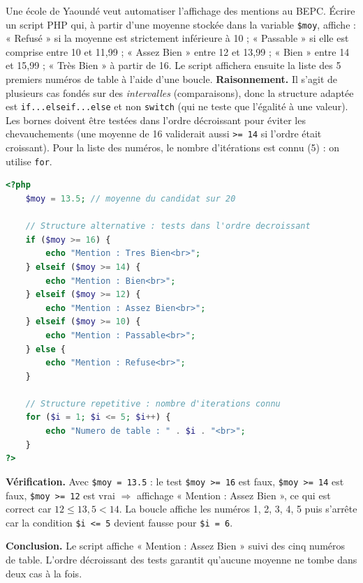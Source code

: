 \documentclass[11pt]{article}
\begin{document}
\begin{exoresolu}
Une école de Yaoundé veut automatiser l'affichage des mentions au BEPC. Écrire un script PHP qui, à partir d'une moyenne stockée dans la variable \texttt{\$moy}, affiche : « Refusé » si la moyenne est strictement inférieure à 10 ; « Passable » si elle est comprise entre 10 et 11,99 ; « Assez Bien » entre 12 et 13,99 ; « Bien » entre 14 et 15,99 ; « Très Bien » à partir de 16. Le script affichera ensuite la liste des 5 premiers numéros de table à l'aide d'une boucle.
\tcblower
\textbf{Raisonnement.} Il s'agit de plusieurs cas fondés sur des \emph{intervalles} (comparaisons), donc la structure adaptée est \texttt{if...elseif...else} et non \texttt{switch} (qui ne teste que l'égalité à une valeur). Les bornes doivent être testées dans l'ordre décroissant pour éviter les chevauchements (une moyenne de 16 validerait aussi \texttt{>= 14} si l'ordre était croissant). Pour la liste des numéros, le nombre d'itérations est connu (5) : on utilise \texttt{for}.

\begin{lstlisting}[language=Php]
<?php
    $moy = 13.5; // moyenne du candidat sur 20

    // Structure alternative : tests dans l'ordre decroissant
    if ($moy >= 16) {
        echo "Mention : Tres Bien<br>";
    } elseif ($moy >= 14) {
        echo "Mention : Bien<br>";
    } elseif ($moy >= 12) {
        echo "Mention : Assez Bien<br>";
    } elseif ($moy >= 10) {
        echo "Mention : Passable<br>";
    } else {
        echo "Mention : Refuse<br>";
    }

    // Structure repetitive : nombre d'iterations connu
    for ($i = 1; $i <= 5; $i++) {
        echo "Numero de table : " . $i . "<br>";
    }
?>
\end{lstlisting}

\textbf{Vérification.} Avec \texttt{\$moy = 13.5} : le test \texttt{\$moy >= 16} est faux, \texttt{\$moy >= 14} est faux, \texttt{\$moy >= 12} est vrai $\Rightarrow$ affichage « Mention : Assez Bien », ce qui est correct car $12 \leq 13{,}5 < 14$. La boucle affiche les numéros 1, 2, 3, 4, 5 puis s'arrête car la condition \texttt{\$i <= 5} devient fausse pour \texttt{\$i = 6}.

\textbf{Conclusion.} Le script affiche « Mention : Assez Bien » suivi des cinq numéros de table. L'ordre décroissant des tests garantit qu'aucune moyenne ne tombe dans deux cas à la fois.
\end{exoresolu}
\end{document}
